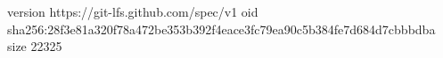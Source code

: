 version https://git-lfs.github.com/spec/v1
oid sha256:28f3e81a320f78a472be353b392f4eace3fc79ea90c5b384fe7d684d7cbbbdba
size 22325
